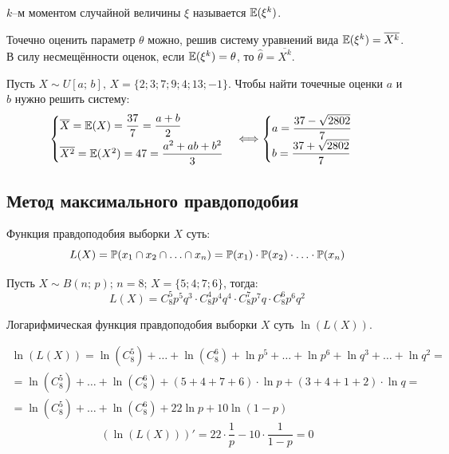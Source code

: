 \documentclass[12pt]{article}
\begin{document}
\begin{definition}
    $k$–м моментом случайной величины $\xi$ называется $\mathbb{E}(\xi^k)$.
\end{definition}
\begin{theorem}
    Точечно оценить параметр $\theta$ можно, решив систему уравнений вида $\mathbb{E}(\xi^k)=\overline{X^k}$. В силу несмещённости оценок, если $\mathbb{E}(\xi^k)=\theta$, то $\hat\theta=\overline{X^k}$.
\end{theorem}
\begin{example}
    Пусть $X\sim U[a;\,b],\,X=\{2;3;7;9;4;13;-1\}$. Чтобы найти точечные оценки $a$ и $b$ нужно решить систему:
    $$\begin{cases}
        \overline{X}=\mathbb{E}(X)=\dfrac{37}{7}=\dfrac{a+b}{2}\\[2\jot]
        \overline{X^2}=\mathbb{E}(X^2)=47=\dfrac{a^2+ab+b^2}{3}
    \end{cases}\Longleftrightarrow\begin{cases}
        a=\dfrac{37-\sqrt{2802}}{7}\\
        b=\dfrac{37+\sqrt{2802}}{7}
    \end{cases}$$
\end{example}

\subsection{Метод максимального правдоподобия}

\begin{definition}
    Функция правдоподобия выборки $X$ суть:
    $$L(X)=\mathbb{P}(x_1\cap x_2\cap\ldots\cap x_n)=\mathbb{P}(x_1)\cdot\mathbb{P}(x_2)\cdot\ldots\cdot\mathbb{P}(x_n)$$
\end{definition}
\begin{example}
    Пусть $X\sim B(n;\,p);\,n=8;\,X=\{5;4;7;6\}$, тогда:
    $$L(X)=C_8^5p^5q^3\cdot C_8^4p^4q^4\cdot C_8^7p^7q\cdot C_8^6p^6q^2$$
\end{example}
\begin{definition}
    Логарифмическая функция правдоподобия выборки $X$ суть $\ln(L(X))$.
\end{definition}
\begin{example}
    \begin{multline*}
        \ln(L(X))=\ln(C_8^5)+\ldots+\ln(C_8^6)+\ln p^5+\ldots+\ln p^6+\ln q^3+\ldots+\ln q^2=\\
        =\ln(C_8^5)+\ldots+\ln(C_8^6)+(5+4+7+6)\cdot\ln p+(3+4+1+2)\cdot\ln q=\\
        =\ln(C_8^5)+\ldots+\ln(C_8^6)+22\ln p+10\ln(1-p)
    \end{multline*}
    $$\left(\ln(L(X))\right)'=22\cdot\dfrac{1}{p}-10\cdot\dfrac{1}{1-p}=0$$
\end{example}
\end{document}
